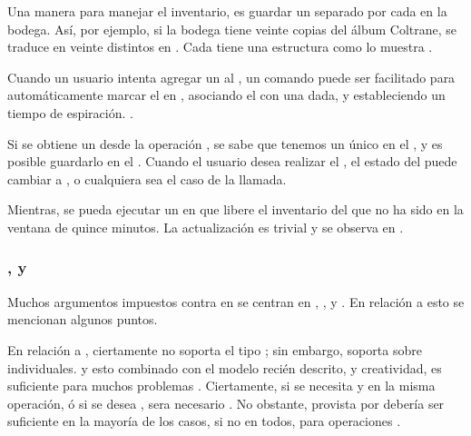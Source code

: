 Una manera para manejar el inventario, es guardar un \documentDB separado por cada \physItem en la bodega. Así, por ejemplo, si la bodega tiene veinte copias del álbum Coltrane, se traduce en veinte \documentsDB distintos en \inventoryCommerce \collectionDB. Cada \documentDB tiene una estructura como lo muestra .


Cuando un usuario intenta agregar un \itemCOM al \cartCOM, un comando \findAndModifyOperatorDB puede ser facilitado para automáticamente marcar el \itemCOM en \inCart, asociando el \itemCOM con una \orderCommerce dada, y estableciendo un tiempo de espiración. .



Si se obtiene un \itemBackDB desde la operación \findAndModifyOperatorDB, se sabe que tenemos un único \lockDB en el \itemCOM, y es posible guardarlo en el \cartCOM. Cuando el usuario desea realizar el \checkoutCOM, el estado del \itemCOM puede cambiar a \purchasedCOM, o cualquiera sea el caso de la llamada.

Mientras, se pueda ejecutar un \scriptPL en \backgroundPL que libere el inventario del \cartCOM que no ha sido \purchasedCOM en la ventana de quince minutos. La actualización es trivial y se observa en .


\subsubsection{\transactionsDB, \consistencyDB y \durabilityDB}

Muchos argumentos impuestos contra \nosqlNAME en \ecommerce se centran en \transactionsDB, \consistencyDB, y \durabilityDB. En relación a esto se mencionan algunos puntos.

En relación a \transactionsDB, ciertamente \mongodbNAME no soporta el tipo \multiObjectDB; sin embargo, soporta \atomicOperationsDB sobre \documentsDB individuales. y esto combinado con el modelo \documentOriented recién descrito, y creatividad, es suficiente para muchos problemas \ecommerce. Ciertamente, si se necesita \debitOneAccount y \creditAnother en la misma operación, ó si se desea \rollbackDB, sera necesario \fullFledgedTransDB. No obstante, \transactionalityDB provista por \mongodbNAME debería ser suficiente en la mayoría de los casos, si no en todos, para operaciones \ecommerce.

